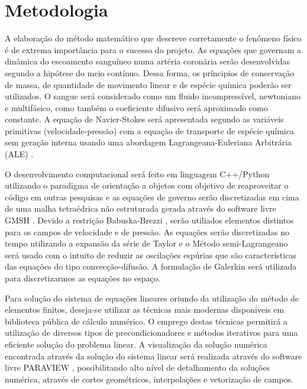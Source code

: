 \section{Metodologia}

A elaboração do método matemático que descreve corretamente o fenômeno físico é de extrema importância para o sucesso do projeto. 
As equações que governam a dinâmica do escoamento sanguíneo numa artéria coronária serão desenvolvidas segundo a hipótese do meio contínuo. 
Dessa forma, os príncipios de conservação de massa, de quantidade de movimento linear e de espécie química poderão ser utilizados. 
O sangue será considerado como um fluido incompressível, newtoniano e multifásico, 
como também o coeficiente difusivo será aproximado como constante. 
A equação de Navier-Stokes será apresentada segundo as variáveis primitivas (velocidade-pressão) com 
a equação de transporte de espécie química sem geração interna
usando uma abordagem Lagrangeana-Euleriana Arbitrária (ALE) \cite{donea2004}.

\medskip
O desenvolvimento computacional será feito em linguagem C++/Python \cite{c++} \cite{python} 
utilizando o paradigma de orientação a objetos com objetivo de reaproveitar o código em outras pesquisas e 
as equações de governo serão discretizadas em cima de uma malha tetraédrica não estruturada gerada através do software livre GMSH \cite{gmsh}. 
Devido a restrição Babuska-Brezzi \cite{babuska1971} \cite{brezzi1974}, serão utiliados elementos distintos para os campos de velocidade e de pressão. 
As equações serão discretizadas no tempo utilizando a expansão da série de Taylor e o Método semi-Lagrangeano \cite{pironneau1982} será usado com o intuito de reduzir as oscilações espúrias que são características das equações do tipo convecção-difusão.
A formulação de Galerkin \cite{zienkiewicz1965} será utilizada para discretizarmos as equações no espaço. 

\medskip
Para solução do sistema de equações lineares oriundo da utilização do método de elementos finitos, 
deseja-se utilizar as técnicas mais modernas disponiveis em biblioteca pública de cálculo numérico. 
O emprego destas técnicas permitirá a utilização de diversos tipos de precondicionadores e 
métodos iterativos para uma eficiente solução do problema linear. 
A visualização da solução numérica encontrada através da solução do sistema linear será realizada através do software livre PARAVIEW \cite{paraview}, 
possibilitando alto nível de detalhamento da soluções numérica, através de cortes geométricos, interpolações e vetorização de campos.

